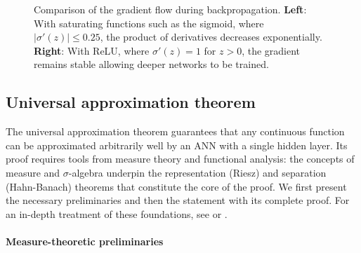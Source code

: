 \begin{figure}[htbp]
\caption[Vanishing gradient problem]{Comparison of the gradient flow during backpropagation. \textbf{Left}: With saturating functions such as the sigmoid, where $|\sigma'(z)| \leq 0.25$, the product of derivatives decreases exponentially. \textbf{Right}: With ReLU, where $\sigma'(z) = 1$ for $z > 0$, the gradient remains stable allowing deeper networks to be trained.}
\label{fig:vanishing_gradient}
\end{figure}

\subsection{Universal approximation theorem}\label{sec:aproximacion_universal}

The universal approximation theorem guarantees that any continuous function can be approximated arbitrarily well by an \gls{ANN} with a single hidden layer. Its proof requires tools from measure theory and functional analysis: the concepts of measure and $\sigma$-algebra underpin the representation (Riesz) and separation (Hahn-Banach) theorems that constitute the core of the proof. We first present the necessary preliminaries and then the statement with its complete proof. For an in-depth treatment of these foundations, see \citet{Folland1999} or \citet{Rudin1976}.

\paragraph{Measure-theoretic preliminaries}

